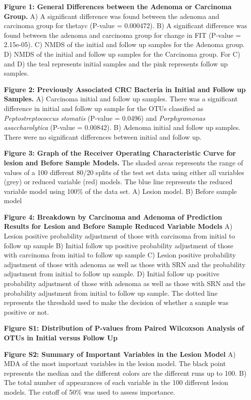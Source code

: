 \documentclass[12pt,]{article}
\begin{document}
\textbf{Figure 1: General Differences between the Adenoma or Carcinoma
Group.} A) A significant difference was found between the adenoma and
carcinoma group for thetayc (P-value = 0.000472). B) A significant
difference was found between the adenoma and carcinoma group for change
in FIT (P-value = 2.15e-05). C) NMDS of the initial and follow up
samples for the Adenoma group. D) NMDS of the initial and follow up
samples for the Carcinoma group. For C) and D) the teal represents
initial samples and the pink represents follow up samples.

\textbf{Figure 2: Previously Associated CRC Bacteria in Initial and
Follow up Samples.} A) Carcinoma initial and follow up samples. There
was a significant difference in initial and follow up sample for the
OTUs classified as \emph{Peptostreptococcus stomatis} (P-value = 0.0496)
and \emph{Porphyromonas asaccharolytica} (P-value = 0.00842). B) Adenoma
initial and follow up samples. There were no significant differences
between initial and follow up.

\textbf{Figure 3: Graph of the Receiver Operating Characteristic Curve
for lesion and Before Sample Models.} The shaded areas represents the
range of values of a 100 different 80/20 splits of the test set data
using either all variables (grey) or reduced variable (red) models. The
blue line represents the reduced variable model using 100\% of the data
set. A) Lesion model. B) Before sample model

\textbf{Figure 4: Breakdown by Carcinoma and Adenoma of Prediction
Results for Lesion and Before Sample Reduced Variable Models} A) Lesion
positive probability adjustment of those with carcinoma from initial to
follow up sample B) Initial follow up positive probability adjustment of
those with carcinoma from initial to follow up sample C) Lesion positive
probability adjustment of those with adenoma as well as those with SRN
and the probability adjustment from initial to follow up sample. D)
Initial follow up positive probability adjustment of those with adenoma
as well as those with SRN and the probability adjustment from initial to
follow up sample. The dotted line represents the threshold used to make
the decision of whether a sample was positive or not.

\newpage

\textbf{Figure S1: Distribution of P-values from Paired Wilcoxson
Analysis of OTUs in Initial versus Follow Up}

\textbf{Figure S2: Summary of Important Variables in the Lesion Model}
A) MDA of the most important variables in the lesion model. The black
point represents the median and the different colors are the different
runs up to 100. B) The total number of appearances of each variable in
the 100 different lesion models. The cutoff of 50\% was used to assess
importance.
\end{document}
